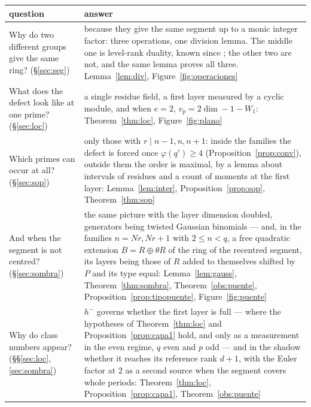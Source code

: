 \documentclass[11pt,a4paper]{article}
\theoremstyle{definition}
\begin{document}
\begin{table}[tb]
\centering\small
{}
\begin{tabular}{@{}p{}p{}@{}}
\toprule
question & answer \\
\midrule
Why do two different groups give the same ring? (\S\ref{sec:seg}) &
because they give the same segment up to a monic integer factor: three operations, one division
lemma. The middle one is level-rank duality, known since \cite{PS86,NT92}; the other two are not,
and the same lemma proves all three. Lemma~\ref{lem:div},
Figure~\ref{fig:operaciones} \\
What does the defect look like at one prime? (\S\ref{sec:loc}) &
a single residue field, a first layer measured by a cyclic module, and
when $e=2$, $v_p=2\dim-1-W_1$: Theorem~\ref{thm:loc}, Figure~\ref{fig:plano} \\
Which primes can occur at all? (\S\ref{sec:sop}) &
only those with $r\mid n-1,n,n+1$: inside the families the defect is forced once
$\varphi(q')\ge4$ (Proposition~\ref{prop:conv}), outside them the order is maximal, by a lemma about intervals of
residues and a count of moments at the first layer: Lemma~\ref{lem:inter},
Proposition~\ref{prop:sop}, Theorem~\ref{thm:sop} \\
And when the segment is not centred? (\S\ref{sec:sombra}) &
the same picture with the layer dimension doubled, generators being twisted Gaussian binomials ---
and, in the families $n=Nr,Nr+1$ with $2\le n<q$, a free quadratic extension $B=R\oplus\theta R$ of the ring of
the recentred segment, its layers being those of $R$ added to themselves shifted by $P$ and its
type equal:
Lemma~\ref{lem:gauss}, Theorem~\ref{thm:sombra}, Theorem~\ref{obs:puente},
Proposition~\ref{prop:tipopuente}, Figure~\ref{fig:puente} \\
Why do class numbers appear? (\S\S\ref{sec:loc}, \ref{sec:sombra}) &
$h^-$ governs whether the first layer is full --- where the hypotheses of Theorem~\ref{thm:loc}
and Proposition~\ref{prop:capa1} hold, and only as a measurement in the even regime, $q$ even and
$p$ odd --- and in the shadow whether it reaches its reference rank $d+1$, with the
Euler factor at $2$ as a second source when the segment covers whole periods:
Theorem~\ref{thm:loc}, Proposition~\ref{prop:capa1}, Theorem~\ref{obs:puente} \\
\bottomrule
\end{tabular}
\end{table}
\end{document}
